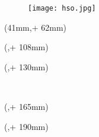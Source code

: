 \captionsetup[figure]{labelformat=empty}
\noindent 
\begin{figure}
	\texttt{[image: hso.jpg]}
	\caption[]{}
\end{figure}
\captionsetup[figure]{labelformat=simple}
\begin{textblock*}{128mm}(41mm,\seitenanfang + 62mm) %
  \centering\Large\sffamily
  \vspace{12mm} %
  \textbf{\hsmatitel}
\end{textblock*}%

\begin{textblock*}{\seitenbreite}(\bindekorrektur,\seitenanfang + 108mm)
  \centering\large\sffamily
  \hsmaautor
\end{textblock*}

\begin{textblock*}{\seitenbreite}(\bindekorrektur,\seitenanfang + 130mm)
  \centering\large\sffamily
  \textbf{\hsmatyp}\\
  \begin{small}\hsmathesistype \end{small}\\
  \vspace{6mm}
  \hsmastudiengangname
\end{textblock*}

\begin{textblock*}{\seitenbreite}(\bindekorrektur,\seitenanfang + 165mm)
  \centering\large\sffamily
  \hsmafakultaetlang\\
  \vspace{2mm}
  \hsmakoerperschaft
\end{textblock*}

\begin{textblock*}{\seitenbreite}(\bindekorrektur,\seitenanfang + 190mm)
  \centering\large 
  \textsf{\hsmadatum}
\end{textblock*}

